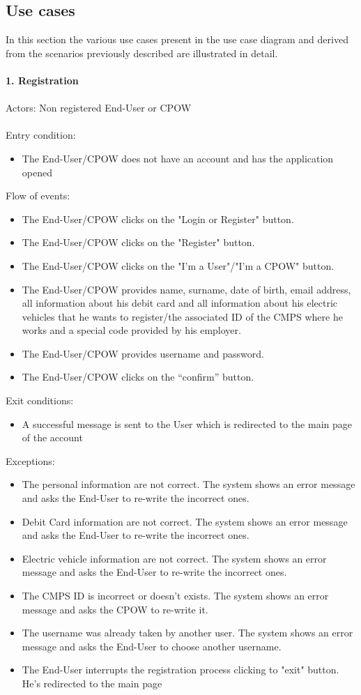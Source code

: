 \documentclass[a4paper]{report}
\begin{document}
\subsection{Use cases}
In this section the various use cases present in the use case diagram and derived from the scenarios previously described are illustrated in detail.\\ \\
\textbf{1. Registration}\label{uc:1}
\\
\\
Actors: Non registered End-User or CPOW\\ \\
Entry condition:
\begin{itemize}
\item The End-User/CPOW does not have an account and has the application opened
\end{itemize}
Flow of events:
\begin{itemize}
\item The End-User/CPOW clicks on the "Login or Register" button.
\item The End-User/CPOW clicks on the "Register" button.
\item The End-User/CPOW clicks on the "I'm a User"/"I'm a CPOW" button.
\item The End-User/CPOW provides name, surname, date of birth, email address, all information about his debit card and all information about his electric vehicles that he wants to register/the associated ID of the CMPS where he works and a special code provided by his employer.
\item The End-User/CPOW provides username and password.
\item The End-User/CPOW clicks on the “confirm” button.
\end{itemize}
Exit conditions:
\begin{itemize}
\item A successful message is sent to the User which is redirected to the main page of the account
\end{itemize}
Exceptions:
\begin{itemize}
\item The personal information are not correct. The system shows an error message and asks the End-User to re-write the incorrect ones.
\item Debit Card information are not correct. The system shows an error message and asks the End-User to re-write the incorrect ones.
\item Electric vehicle information are not correct. The system shows an error message and asks the End-User to re-write the incorrect ones.
\item The CMPS ID is incorrect or doesn't exists. The system shows an error message and asks the CPOW to re-write it.
\item The username was already taken by another user. The system shows an error message and asks the End-User to choose another username.
\item The End-User interrupts the registration process clicking to "exit" button. He's redirected to the main page
\end{itemize}
\end{document}

